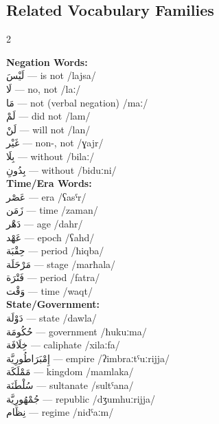 \documentclass[letterpaper,12pt]{article}
\begin{document}
\subsection{Related Vocabulary Families}

\begin{multicols}{2}

\textbf{Negation Words:}\\
\textarabic{لَيْسَ} — is not /lajsa/\\
\textarabic{لَا} — no, not /laː/\\
\textarabic{مَا} — not (verbal negation) /maː/\\
\textarabic{لَمْ} — did not /lam/\\
\textarabic{لَنْ} — will not /lan/\\
\textarabic{غَيْر} — non-, not /ɣajr/\\
\textarabic{بِلَا} — without /bilaː/\\
\textarabic{بِدُونِ} — without /biduːni/\\

\textbf{Time/Era Words:}\\
\textarabic{عَصْر} — era /ʕasˤr/\\
\textarabic{زَمَن} — time /zaman/\\
\textarabic{دَهْر} — age /dahr/\\
\textarabic{عَهْد} — epoch /ʕahd/\\
\textarabic{حِقْبَة} — period /ħiqba/\\
\textarabic{مَرْحَلَة} — stage /marħala/\\
\textarabic{فَتْرَة} — period /fatra/\\
\textarabic{وَقْت} — time /waqt/\\

\textbf{State/Government:}\\
\textarabic{دَوْلَة} — state /dawla/\\
\textarabic{حُكُومَة} — government /ħukuːma/\\
\textarabic{خِلَافَة} — caliphate /xilaːfa/\\
\textarabic{إِمْبَرَاطُورِيَّة} — empire /ʔimbraːtˤuːrijja/\\
\textarabic{مَمْلَكَة} — kingdom /mamlaka/\\
\textarabic{سُلْطَنَة} — sultanate /sultˤana/\\
\textarabic{جُمْهُورِيَّة} — republic /dʒumhuːrijja/\\
\textarabic{نِظَام} — regime /nidˤaːm/\\


\end{multicols}
\end{document}
